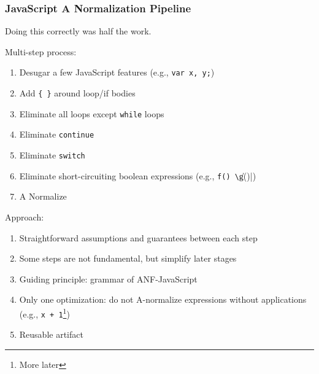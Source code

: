 \documentclass[8pt,pdf,handout]{beamer}
\begin{document}
\begin{frame}
\frametitle{JavaScript A Normalization Pipeline}

Doing this correctly was half the work.

Multi-step process:
\begin{enumerate}

  \item Desugar a few JavaScript features (e.g., \lstinline|var x, y;|)
  \item Add \lstinline|{ }| around loop/if bodies
  \item Eliminate all loops except \lstinline|while| loops
  \item Eliminate \lstinline|continue|
  \item Eliminate \lstinline|switch|
  \item Eliminate short-circuiting boolean expressions (e.g., \lstinline|f() \|\| g()|)
  \item A Normalize

\end{enumerate}

\pause

Approach:
\begin{enumerate}
  \item Straightforward assumptions and guarantees between each step
  \item Some steps are not fundamental, but simplify later stages
  \item Guiding principle: grammar of ANF-JavaScript
  \item Only one optimization: do not A-normalize expressions without
  applications (e.g., \lstinline|x + 1|\footnote{More later})
  \item Reusable artifact
\end{enumerate}

\end{frame}
\end{document}
